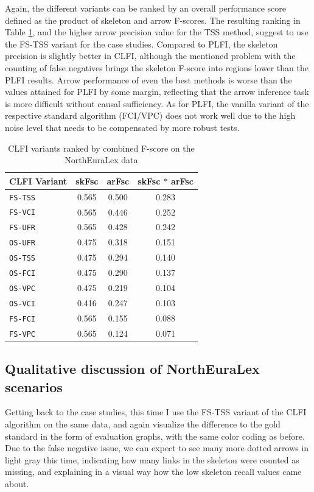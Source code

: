 Again, the different variants can be ranked by an overall performance score defined as the product of skeleton and arrow F-scores. The resulting ranking in Table \ref{contact-variant-comparison-nelex}, and the higher arrow precision value for the TSS method, suggest to use the FS-TSS variant for the case studies. Compared to PLFI, the skeleton precision is slightly better in CLFI, although the mentioned problem with the counting of false negatives brings the skeleton F-score into regions lower than the PLFI results. Arrow performance of even the best methods is worse than the values attained for PLFI by some margin, reflecting that the arrow inference task is more difficult without causal sufficiency. As for PLFI, the vanilla variant of the respective standard algorithm (FCI/VPC) does not work well due to the high noise level that needs to be compensated by more robust tests.

\begin{table}
 \centering
 \begin{tabular}{lccc}
 \hline \hline
  CLFI Variant & skFsc & arFsc & skFsc $\ast$ arFsc\\ 
 \hline
\texttt{FS-TSS} & 0.565 & 0.500 & 0.283\\
\texttt{FS-VCI} & 0.565 & 0.446 & 0.252\\
\texttt{FS-UFR} & 0.565 & 0.428 & 0.242\\
\texttt{OS-UFR} & 0.475 & 0.318 & 0.151\\
\texttt{OS-TSS} & 0.475 & 0.294 & 0.140\\
\texttt{OS-FCI} & 0.475 & 0.290 & 0.137\\
\texttt{OS-VPC} & 0.475 & 0.219 & 0.104\\
\texttt{OS-VCI} & 0.416 & 0.247 & 0.103\\
\texttt{FS-FCI} & 0.565 & 0.155 & 0.088\\
\texttt{FS-VPC} & 0.565 & 0.124 & 0.071\\
  \hline
 \end{tabular}
 \caption{CLFI variants ranked by combined F-score on the NorthEuraLex data}
 \label{contact-variant-comparison-nelex}
\end{table}

\subsection{Qualitative discussion of NorthEuraLex scenarios}
Getting back to the case studies, this time I use the FS-TSS variant of the CLFI algorithm on the same data, and again visualize the difference to the gold standard in the form of evaluation graphs, with the same color coding as before. Due to the false negative issue, we can expect to see many more dotted arrows in light gray this time, indicating how many links in the skeleton were counted as missing, and explaining in a visual way how the low skeleton recall values came about.

